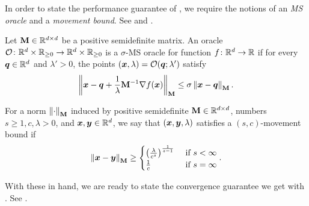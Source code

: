 In order to state the performance guarantee of , we require the notions of an \textit{MS oracle} and a \textit{movement bound}. See  and .

\begin{definition}
\label{defn:ms_oracle}
Let $\mathbf{M} \in \mathbb{R}^{d\times d}$ be a positive semidefinite matrix. An oracle $\mathcal{O}\colon\mathbb{R}^d \times \mathbb{R}_{\ge 0}\rightarrow\mathbb{R}^d \times \mathbb{R}_{\ge 0}$ is a $\sigma$-MS oracle for function $f\colon\mathbb{R}^d\rightarrow\mathbb{R}$ if for every $\bm{q}\in\mathbb{R}^d$ and $\lambda' > 0$, the points $(\bm{x},\lambda)=\mathcal{O}(\bm{q};\lambda')$ satisfy
\begin{align*}
    \left\lVert \bm{x}-\bm{q}+\frac{1}{\lambda}\mathbf{M}^{-1}\nabla f(\bm{x}) \right\rVert_{\mathbf{M}} \le \sigma\left\lVert \bm{x}-\bm{q} \right\rVert_{\mathbf{M}}.
\end{align*}
\end{definition}

\begin{definition}
\label{defn:movement_bound}
For a norm $\left\lVert \cdot \right\rVert_{\mathbf{M}}$ induced by positive semidefinite $\mathbf{M}\in\mathbb{R}^{d\times d}$, numbers $s \ge 1, c, \lambda > 0$, and $\bm{x},\bm{y}\in\mathbb{R}^d$, we say that $(\bm{x},\bm{y},\lambda)$ satisfies a $(s,c)$-movement bound if
\begin{align*}
    \left\lVert \bm{x}-\bm{y} \right\rVert_{\mathbf{M}} \ge \begin{cases} \left(\frac{\lambda}{c^s}\right)^{\frac{1}{s-1}} & \text{ if } s < \infty \\ \frac{1}{c} & \text{ if } s = \infty \end{cases}.
\end{align*}
\end{definition}

With these in hand, we are ready to state the convergence guarantee we get with . See .

